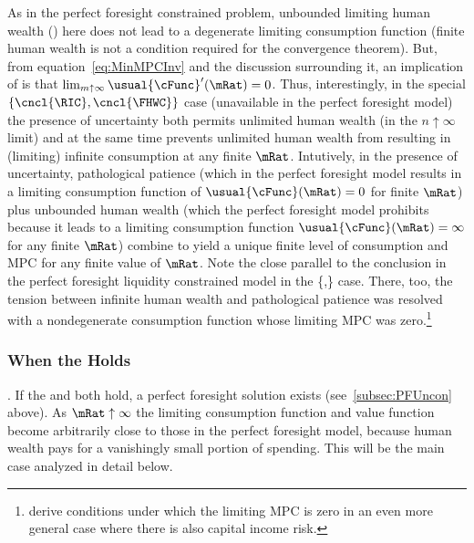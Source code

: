 \documentclass[BufferStockTheory]{subfiles}
\begin{document}
As in the perfect foresight constrained problem, unbounded limiting human wealth (\cncl{\FHWC}) here does not lead to a degenerate limiting consumption function (finite human wealth is not a condition required for the convergence theorem).  But, from equation~\eqref{eq:MinMPCInv} and the discussion surrounding it, an implication of \cncl{\RIC} is that $\lim_{m \uparrow \infty} \usual{\cFunc}^{\prime}(\mRat) = 0$.  Thus, interestingly, in the special $\{\cncl{\RIC},\cncl{\FHWC}\}$ case (unavailable in the perfect foresight model) the presence of uncertainty both permits unlimited human wealth (in the $n\uparrow\infty$ limit) and at the same time prevents unlimited human wealth from resulting in (limiting) infinite consumption at any finite $\mRat$.  Intutively, in the presence of uncertainty, pathological patience (which in the perfect foresight model results in a limiting consumption function of $\usual{\cFunc}(\mRat)=0$ for finite $\mRat$) plus unbounded human wealth (which the perfect foresight model prohibits because it leads to a limiting consumption function $\usual{\cFunc}(\mRat)=\infty$ for any finite $\mRat$) combine to yield a unique finite level of consumption and MPC for any finite value of $\mRat$.  Note the close parallel to the conclusion in the perfect foresight liquidity constrained model in the \{\GICRaw,\cncl{\RIC}\} case.  There, too, the tension between infinite human wealth and pathological patience was resolved with a nondegenerate consumption function whose limiting MPC was zero.\footnote{\cite{maTodaRich} derive conditions under which the limiting MPC is zero in an even more general case where there is also capital income risk.}

\hypertarget{When-the-RIC-Holds}{}
\subsubsection{When the {\RIC} Holds}\label{subsubsec:WhenTheGICNrmFails}\label{subsubsec:WhenTheRICHolds}

\indent \textbf{\FHWC}.  If the {\RIC} and {\FHWC} both hold, a perfect foresight solution exists (see~\ref{subsec:PFUncon} above).  As $\mRat \uparrow \infty$ the limiting consumption function and value function become arbitrarily close to those in the perfect foresight model, because human wealth pays for a vanishingly small portion of spending.  This will be the main case analyzed in detail below.
\end{document}
